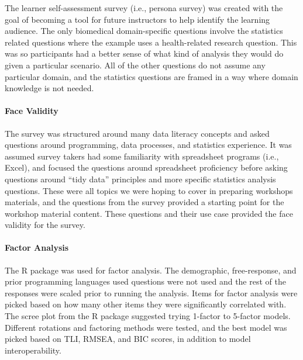 \documentclass[020-persona\_validation.tex]{subfiles}
\begin{document}
            The learner self-assessment survey (i.e., persona survey)
            was created with the goal of becoming a tool for future instructors
            to help identify the learning audience.
            The only biomedical domain-specific questions involve the statistics related questions
            where the example uses a health-related research question.
            This was so participants had a better sense of what kind of analysis they would do given a particular scenario.
            All of the other questions do not assume any particular domain,
            and the statistics questions are framed in a way where domain knowledge is not needed.

            \paragraph{Face Validity}

                The survey was structured around many data literacy concepts and asked questions around
                programming, data processes, and statistics experience.
                It was assumed survey takers had some familiarity with spreadsheet programs (i.e., Excel),
                and focused the questions around spreadsheet proficiency before asking questions
                around ``tidy data'' principles and more specific statistics analysis questions.
                These were all topics we were hoping to cover in preparing workshops materials,
                and the questions from the survey provided a starting point for the workshop material content.
                These questions and their use case provided the face validity for the survey.

            \paragraph{Factor Analysis}
        
                The  R package was used for factor analysis.
                The demographic, free-response, and prior programming languages used questions
                were not used and the rest of the responses were scaled prior to running the analysis.
                Items for factor analysis were picked based on how many other items they were significantly correlated with.
                The scree plot from the R  package suggested trying 1-factor to 5-factor models.
                Different rotations and factoring methods were tested,
                and the best model was picked based on
                TLI, RMSEA, and BIC scores, in addition to model interoperability.
\end{document}

